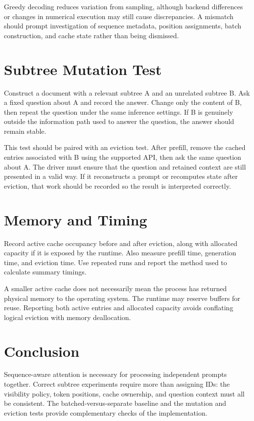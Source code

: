 \documentclass{article}
\begin{document}
Greedy decoding reduces variation from sampling, although backend differences or changes in numerical execution may still cause discrepancies. A mismatch should prompt investigation of sequence metadata, position assignments, batch construction, and cache state rather than being dismissed.

\section{Subtree Mutation Test}
Construct a document with a relevant subtree A and an unrelated subtree B. Ask a fixed question about A and record the answer. Change only the content of B, then repeat the question under the same inference settings. If B is genuinely outside the information path used to answer the question, the answer should remain stable.

This test should be paired with an eviction test. After prefill, remove the cached entries associated with B using the supported API, then ask the same question about A. The driver must ensure that the question and retained context are still presented in a valid way. If it reconstructs a prompt or recomputes state after eviction, that work should be recorded so the result is interpreted correctly.

\section{Memory and Timing}
Record active cache occupancy before and after eviction, along with allocated capacity if it is exposed by the runtime. Also measure prefill time, generation time, and eviction time. Use repeated runs and report the method used to calculate summary timings.

A smaller active cache does not necessarily mean the process has returned physical memory to the operating system. The runtime may reserve buffers for reuse. Reporting both active entries and allocated capacity avoids conflating logical eviction with memory deallocation.

\section{Conclusion}
Sequence-aware attention is necessary for processing independent prompts together. Correct subtree experiments require more than assigning IDs: the visibility policy, token positions, cache ownership, and question context must all be consistent. The batched-versus-separate baseline and the mutation and eviction tests provide complementary checks of the implementation.
\end{document}

